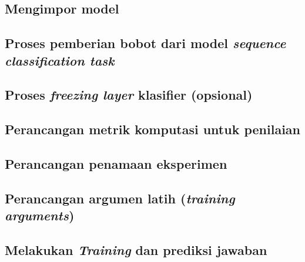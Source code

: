 \subsection{Mengimpor model}

\subsection{Proses pemberian bobot dari model \emph{sequence classification task}}

\subsection{Proses \emph{freezing layer} klasifier (opsional)}

\subsection{Perancangan metrik komputasi untuk penilaian}

\subsection{Perancangan penamaan eksperimen}

\subsection{Perancangan argumen latih (\emph{training arguments})}

\subsection{Melakukan \emph{Training} dan prediksi jawaban}

